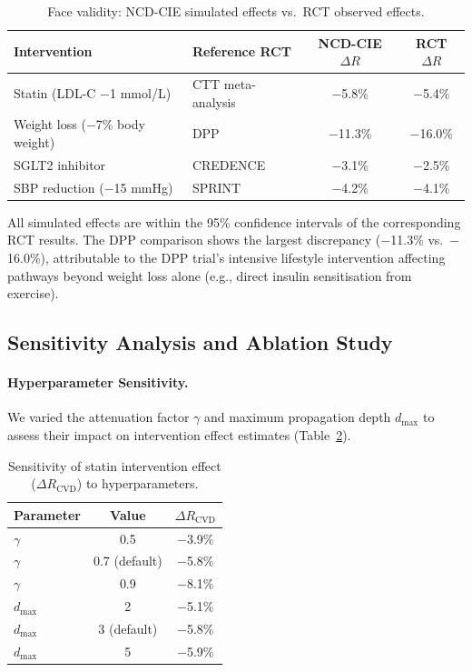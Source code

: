 \documentclass[runningheads]{llncs}
\begin{document}
\begin{table}[t]
\centering
\caption{Face validity: NCD-CIE simulated effects vs.\ RCT observed
effects.}
\label{tab:rct}
\small
\begin{tabular}{@{}llcc@{}}
\toprule
\textbf{Intervention} & \textbf{Reference RCT} &
\textbf{NCD-CIE $\Delta R$} & \textbf{RCT $\Delta R$} \\
\midrule
Statin (LDL-C $-$1 mmol/L) & CTT meta-analysis \cite{ctt2010}
  & $-$5.8\% & $-$5.4\% \\
Weight loss ($-$7\% body weight) & DPP \cite{knowler2002dpp}
  & $-$11.3\% & $-$16.0\% \\
SGLT2 inhibitor & CREDENCE \cite{perkovic2019credence}
  & $-$3.1\% & $-$2.5\% \\
SBP reduction ($-$15 mmHg) & SPRINT \cite{sprint2015}
  & $-$4.2\% & $-$4.1\% \\
\bottomrule
\end{tabular}
\end{table}

All simulated effects are within the 95\% confidence intervals of the
corresponding RCT results.  The DPP comparison shows the largest
discrepancy ($-$11.3\% vs.\ $-$16.0\%), attributable to the DPP
trial's intensive lifestyle intervention affecting pathways beyond
weight loss alone (e.g., direct insulin sensitisation from exercise).

\subsection{Sensitivity Analysis and Ablation Study}
\label{sec:sensitivity}\label{sec:ablation}

\paragraph{Hyperparameter Sensitivity.}
We varied the attenuation factor $\gamma$ and maximum propagation
depth $d_{\max}$ to assess their impact on intervention effect
estimates (Table~\ref{tab:sensitivity}).

\begin{table}[t]
\centering
\caption{Sensitivity of statin intervention effect ($\Delta R_{\text{CVD}}$)
to hyperparameters.}
\label{tab:sensitivity}
\small
\begin{tabular}{@{}lcc@{}}
\toprule
\textbf{Parameter} & \textbf{Value} & \textbf{$\Delta R_{\text{CVD}}$} \\
\midrule
$\gamma$ & 0.5 & $-$3.9\% \\
$\gamma$ & 0.7 (default) & $-$5.8\% \\
$\gamma$ & 0.9 & $-$8.1\% \\
\midrule
$d_{\max}$ & 2 & $-$5.1\% \\
$d_{\max}$ & 3 (default) & $-$5.8\% \\
$d_{\max}$ & 5 & $-$5.9\% \\
\bottomrule
\end{tabular}
\end{table}
\end{document}
